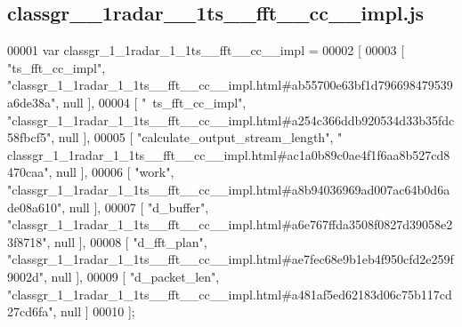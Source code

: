 \subsection{classgr\+\_\+\_\+1radar\+\_\+\_\+1ts\+\_\+\+\_\+fft\+\_\+\+\_\+cc\+\_\+\+\_\+impl.\+js}
\label{classgr__1__1radar__1__1ts____fft____cc____impl_8js_source}

\begin{DoxyCode}
00001 var classgr_1_1radar_1_1ts__fft__cc__impl =
00002 [
00003     [ \textcolor{stringliteral}{"ts\_fft\_cc\_impl"}, \textcolor{stringliteral}{"classgr\_1\_1radar\_1\_1ts\_\_fft\_\_cc\_\_impl.html#ab55700e63bf1d796698479539a6de38a"}, 
      null ],
00004     [ \textcolor{stringliteral}{"~ts\_fft\_cc\_impl"}, \textcolor{stringliteral}{"classgr\_1\_1radar\_1\_1ts\_\_fft\_\_cc\_\_impl.html#a254c366ddb920534d33b35fdc58fbcf5"}, 
      null ],
00005     [ \textcolor{stringliteral}{"calculate\_output\_stream\_length"}, \textcolor{stringliteral}{"
      classgr\_1\_1radar\_1\_1ts\_\_fft\_\_cc\_\_impl.html#ac1a0b89c0ae4f1f6aa8b527cd8470caa"}, null ],
00006     [ \textcolor{stringliteral}{"work"}, \textcolor{stringliteral}{"classgr\_1\_1radar\_1\_1ts\_\_fft\_\_cc\_\_impl.html#a8b94036969ad007ac64b0d6ade08a610"}, null ],
00007     [ \textcolor{stringliteral}{"d\_buffer"}, \textcolor{stringliteral}{"classgr\_1\_1radar\_1\_1ts\_\_fft\_\_cc\_\_impl.html#a6e767ffda3508f0827d39058e23f8718"}, null ],
00008     [ \textcolor{stringliteral}{"d\_fft\_plan"}, \textcolor{stringliteral}{"classgr\_1\_1radar\_1\_1ts\_\_fft\_\_cc\_\_impl.html#ae7fec68e9b1eb4f950cfd2e259f9002d"}, null ],
00009     [ \textcolor{stringliteral}{"d\_packet\_len"}, \textcolor{stringliteral}{"classgr\_1\_1radar\_1\_1ts\_\_fft\_\_cc\_\_impl.html#a481af5ed62183d06c75b117cd27cd6fa"}, null 
      ]
00010 ];
\end{DoxyCode}
